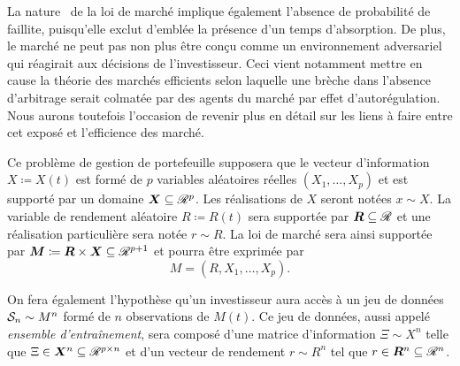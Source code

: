 La nature \iid\ de la loi de marché implique également l'absence de probabilité de
faillite, puisqu'elle exclut d'emblée la présence d'un temps d'absorption. De plus, le
marché ne peut pas non plus être conçu comme un environnement adversariel qui réagirait
aux décisions de l'investisseur. Ceci vient notamment mettre en cause la théorie des
marchés efficients selon laquelle une brèche dans l'absence d'arbitrage serait colmatée
par des agents du marché par effet d'autorégulation. Nous aurons toutefois l'occasion de
revenir plus en détail sur les liens à faire entre cet exposé et l'efficience des marché.

Ce problème de gestion de portefeuille supposera que le vecteur d'information
$X \coloneq X(t)$ est formé de $p$ variables aléatoires réelles $(X_1,\ldots,X_p)$ et est supporté par
un domaine $\X \subseteq \Re^p$. Les réalisations de $X$ seront notées $x \sim X$. La variable de
rendement aléatoire $R \coloneq R(t)$ sera supportée par $\R \subseteq \Re$ et une réalisation particulière
sera notée $r \sim R$.  La loi de marché sera ainsi supportée par
$\M \coloneq \R \times \X \subseteq \Re^{p+1}$ et pourra être exprimée par
\begin{equation}
  M = (R,X_1, \ldots, X_p).
\end{equation}

On fera également l'hypothèse qu'un investisseur aura accès à un jeu de données
$\S_n \sim M^n$ formé de $n$ observations de $M(t)$. Ce jeu de données, aussi appelé
\textit{ensemble d'entraînement}, sera composé d'une matrice d'information $\Xi \sim X^n$ telle
que $\Xi \in \X^n \subseteq \Re^{p \times n}$ et d'un vecteur de rendement $r \sim R^n$ tel que
$r \in \R^n \subseteq \Re^n$.

